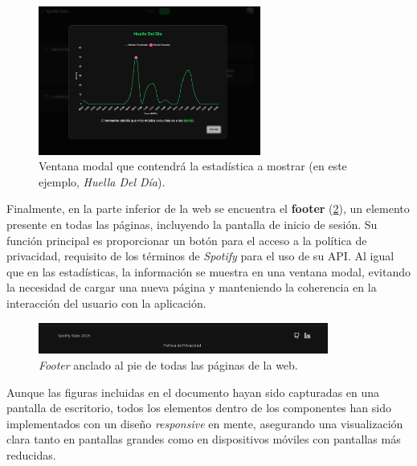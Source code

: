 \begin{figure}[H]
    \centering
    \includegraphics[width=0.65\textwidth]{figures/capturas_ui/modal.png}
    \caption{Ventana modal que contendrá la estadística a mostrar (en este ejemplo, \textit{Huella Del Día}).}
    \label{fig:modal}
\end{figure}

Finalmente, en la parte inferior de la web se encuentra el \textbf{footer} (\ref{fig:footer}), un elemento presente en todas las páginas, incluyendo la pantalla de inicio de sesión. Su función principal es proporcionar un botón para el acceso a la política de privacidad, requisito de los términos de \textit{Spotify} para el uso de su API. Al igual que en las estadísticas, la información se muestra en una ventana modal, evitando la necesidad de cargar una nueva página y manteniendo la coherencia en la interacción del usuario con la aplicación.

\begin{figure}[H]
    \centering
    \includegraphics[width=0.85\textwidth]{figures/capturas_ui/footer.png}
    \caption{\textit{Footer} anclado al pie de todas las páginas de la web.}
    \label{fig:footer}
\end{figure}

Aunque las figuras incluidas en el documento hayan sido capturadas en una pantalla de escritorio, todos los elementos dentro de los componentes han sido implementados con un diseño \textit{responsive} en mente, asegurando una visualización clara tanto en pantallas grandes como en dispositivos móviles con pantallas más reducidas.

